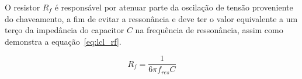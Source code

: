 \documentclass[
	12pt,				%
	openright,			%
	onseside,
	a4paper,			%
	english,			%
	french,				%
	spanish,			%
	brazil,				%
	]{abntex2}
\begin{document}
O resistor $R_f$ é responsável por atenuar parte da oscilação de tensão proveniente do chaveamento, a fim de evitar a ressonância e deve ter o valor equivalente a um terço da impedância do capacitor $C$ na frequência de ressonância\cite{LCL_FILTER_Reznik}, assim como demonstra a equação~\ref{eq:lcl_rf}.

\begin{equation}
	R_f = \frac{1}{6 \pi f_{res} C} \label{eq:lcl_rf}
\end{equation}



 

\end{document}
